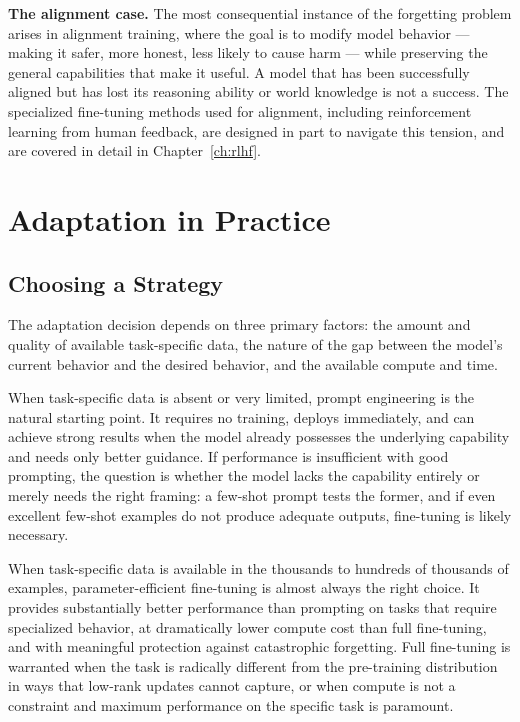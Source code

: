 \documentclass{book}
\begin{document}
\textbf{The alignment case.} The most consequential instance of the
forgetting problem arises in alignment training, where the goal is to
modify model behavior --- making it safer, more honest, less likely to
cause harm --- while preserving the general capabilities that make it
useful. A model that has been successfully aligned but has lost its
reasoning ability or world knowledge is not a success. The specialized
fine-tuning methods used for alignment, including reinforcement learning
from human feedback, are designed in part to navigate this tension, and
are covered in detail in Chapter~\ref{ch:rlhf}.

\section{Adaptation in Practice}
\label{sec:adaptation_practice}

\subsection{Choosing a Strategy}
\label{sec:adaptation_choice}

The adaptation decision depends on three primary factors: the amount and
quality of available task-specific data, the nature of the gap between
the model's current behavior and the desired behavior, and the available
compute and time.

When task-specific data is absent or very limited, prompt engineering
is the natural starting point. It requires no training, deploys
immediately, and can achieve strong results when the model already
possesses the underlying capability and needs only better guidance. If
performance is insufficient with good prompting, the question is whether
the model lacks the capability entirely or merely needs the right
framing: a few-shot prompt tests the former, and if even excellent
few-shot examples do not produce adequate outputs, fine-tuning is likely
necessary.

When task-specific data is available in the thousands to hundreds of
thousands of examples, parameter-efficient fine-tuning is almost always
the right choice. It provides substantially better performance than
prompting on tasks that require specialized behavior, at dramatically
lower compute cost than full fine-tuning, and with meaningful protection
against catastrophic forgetting. Full fine-tuning is warranted when
the task is radically different from the pre-training distribution in
ways that low-rank updates cannot capture, or when compute is not a
constraint and maximum performance on the specific task is paramount.
\end{document}
